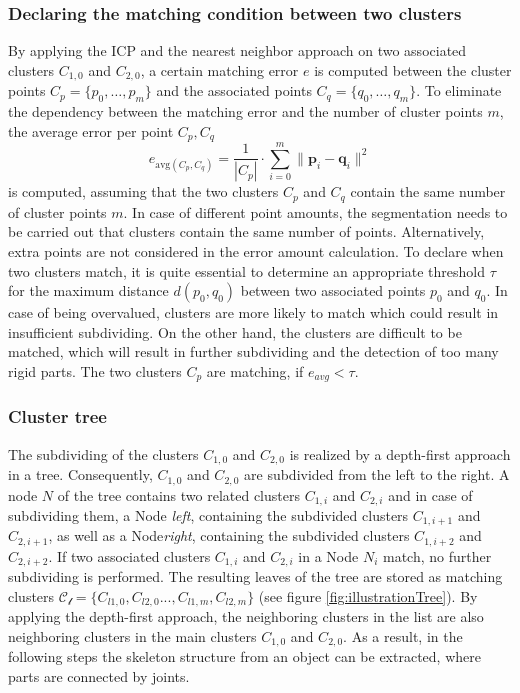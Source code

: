 \documentclass[notitlepage,english]{hgbreport}
\begin{document}
	\subsubsection{Declaring the matching condition between two clusters}
	
	By applying the ICP and the nearest neighbor approach on two associated clusters $C_{1,0}$ and $C_{2,0}$, a certain matching error $e$ is computed between the cluster points $ C_p =  \{ p_0, \ldots, p_m\}$ and the associated points $ C_q =  \{ q_0, \ldots, q_m\}$. To eliminate the dependency between the matching error and the number of cluster points $m$, the average error per point $C_p, C_q$
	\begin{equation}
	e_{\mathrm{avg}(C_p, C_q)} = \frac{1}{| C_p |} \cdot \displaystyle\sum_{i=0}^{m}\| \boldsymbol{p}_i - \boldsymbol{q}_i\|^2
	\end{equation}
	is computed, assuming that the two clusters $C_p$ and $C_q$ contain the same number of cluster points $m$. In case of different point amounts, the segmentation needs to be carried out that clusters contain the same number of points. Alternatively, extra points are not considered in the error amount calculation. To declare when two clusters match, it is quite essential to determine an appropriate threshold $\tau$ for the maximum distance $d(p_0, q_0)$ between two associated points $p_0$ and $q_0$. In case of being overvalued, clusters are more likely to match which could result in insufficient subdividing. On the other hand, the clusters are difficult to be matched, which will result in further subdividing and the detection of too many rigid parts. The two clusters $C_p$ are matching, if $e_{avg} < \tau$.
	
	\subsubsection{Cluster tree}
	\label{tree}
	
	The subdividing of the clusters $C_{1,0}$ and $C_{2,0}$ is realized by a depth-first approach in a tree. Consequently, $C_{1,0}$ and $C_{2,0}$ are subdivided from the left to the right. A node $N$ of the tree contains two related clusters $C_{1,i}$ and $C_{2,i}$ and in case of subdividing them, a Node \textit{left}, containing the subdivided clusters $C_{1,i+1}$ and $C_{2,i+1}$, as well as a Node\textit{right}, containing the subdivided clusters $C_{1,i+2}$ and $C_{2,i+2}$. If two associated clusters $C_{1,i}$ and $C_{2,i}$ in a Node $N_i$ match, no further subdividing is performed. The resulting leaves of the tree are stored as matching clusters $\mathcal{C_l} = \{C_{l1,0},C_{l2,0} ... , C_{l1,m},C_{l2,m}\}$ (see figure \ref{fig:illustrationTree}). By applying the depth-first approach, the neighboring clusters in the list are also neighboring clusters in the main clusters $C_{1,0}$ and $C_{2,0}$.  As a result, in the following steps the skeleton structure from an object can be extracted, where parts are connected by joints.
	
\end{document}
